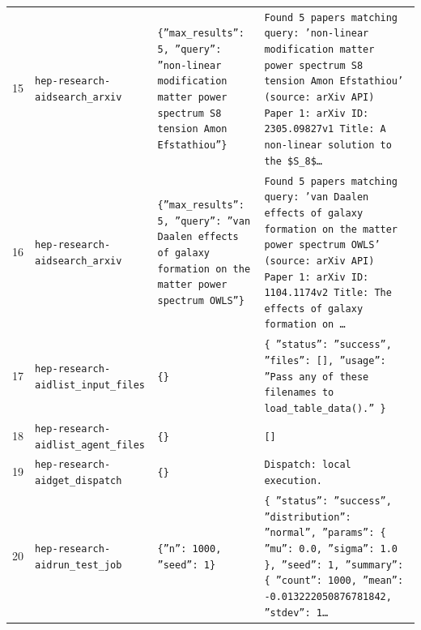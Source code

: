 \documentclass[11pt,a4paper]{article}
\begin{document}
\begin{longtable}{@{}p{}p{}p{}p{}@{}}
15 & \texttt{hep-research-aid}\newline\texttt{search\_\allowbreak{}arxiv} & \texttt{\{''max\_\allowbreak{}results'':\allowbreak{} 5,\allowbreak{} ''query'':\allowbreak{} ''non-linear modification matter power spectrum S8 tension Amon Efstathiou''\}\allowbreak{}} & \texttt{Found 5 papers matching query:\allowbreak{} 'non-linear modification matter power spectrum S8 tension Amon Efstathiou' (source:\allowbreak{} arXiv API)\allowbreak{}  Paper 1:\allowbreak{} arXiv ID:\allowbreak{} 2305.09827v1 Title:\allowbreak{} A non-linear solution to the \$S\_\allowbreak{}8\$\ldots{}\allowbreak{}} \\
16 & \texttt{hep-research-aid}\newline\texttt{search\_\allowbreak{}arxiv} & \texttt{\{''max\_\allowbreak{}results'':\allowbreak{} 5,\allowbreak{} ''query'':\allowbreak{} ''van Daalen effects of galaxy formation on the matter power spectrum OWLS''\}\allowbreak{}} & \texttt{Found 5 papers matching query:\allowbreak{} 'van Daalen effects of galaxy formation on the matter power spectrum OWLS' (source:\allowbreak{} arXiv API)\allowbreak{}  Paper 1:\allowbreak{} arXiv ID:\allowbreak{} 1104.1174v2 Title:\allowbreak{} The effects of galaxy formation on \ldots{}\allowbreak{}} \\
17 & \texttt{hep-research-aid}\newline\texttt{list\_\allowbreak{}input\_\allowbreak{}files} & \texttt{\{\}\allowbreak{}} & \texttt{\{   ''status'':\allowbreak{} ''success'',\allowbreak{}   ''files'':\allowbreak{} []\allowbreak{},\allowbreak{}   ''usage'':\allowbreak{} ''Pass any of these filenames to load\_\allowbreak{}table\_\allowbreak{}data()\allowbreak{}.'' \}\allowbreak{}} \\
18 & \texttt{hep-research-aid}\newline\texttt{list\_\allowbreak{}agent\_\allowbreak{}files} & \texttt{\{\}\allowbreak{}} & \texttt{[]\allowbreak{}} \\
19 & \texttt{hep-research-aid}\newline\texttt{get\_\allowbreak{}dispatch} & \texttt{\{\}\allowbreak{}} & \texttt{Dispatch:\allowbreak{} local execution.} \\
20 & \texttt{hep-research-aid}\newline\texttt{run\_\allowbreak{}test\_\allowbreak{}job} & \texttt{\{''n'':\allowbreak{} 1000,\allowbreak{} ''seed'':\allowbreak{} 1\}\allowbreak{}} & \texttt{\{   ''status'':\allowbreak{} ''success'',\allowbreak{}   ''distribution'':\allowbreak{} ''normal'',\allowbreak{}   ''params'':\allowbreak{} \{     ''mu'':\allowbreak{} 0.0,\allowbreak{}     ''sigma'':\allowbreak{} 1.0   \}\allowbreak{},\allowbreak{}   ''seed'':\allowbreak{} 1,\allowbreak{}   ''summary'':\allowbreak{} \{     ''count'':\allowbreak{} 1000,\allowbreak{}     ''mean'':\allowbreak{} -0.013222050876781842,\allowbreak{}     ''stdev'':\allowbreak{} 1\ldots{}\allowbreak{}} \\

\end{longtable}
\end{document}
